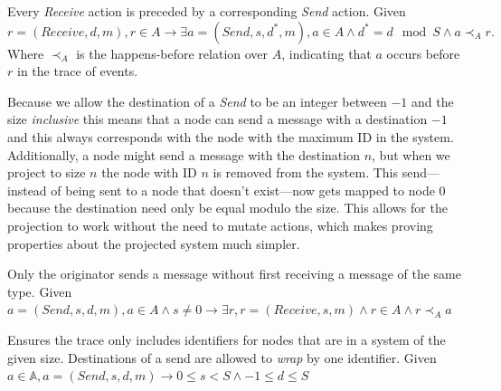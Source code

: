 \documentclass[runningheads]{llncs}
\newcommand{\action}{\mathds{A}}
\newcommand{\happensbefore}{\prec_A}
\begin{document}
\begin{definition}
Every \emph{Receive} action is preceded by a corresponding \emph{Send} action. 
Given $r = (Receive, d, m), r \in A \longrightarrow \exists a = (Send, s, d^*, m), a \in A \wedge d^* = d \mod S \wedge a \happensbefore r.$ Where $\happensbefore$ is the happens-before relation over $A$, indicating that $a$ occurs before $r$ in the trace of events. 
\end{definition}

Because we allow the destination of a \emph{Send} to be an integer between $-1$ and the size \emph{inclusive} this means that a node can send a message with a destination $-1$ and this always corresponds with the node with the maximum ID in the system. Additionally, a node might send a message with the destination $n$, but when we project to size $n$ the node with ID $n$ is removed from the system. This send---instead of being sent to a node that doesn't exist---now gets mapped to node $0$ because the destination need only be equal modulo the size. This allows for the projection to work without the need to mutate actions, which makes proving properties about the projected system much simpler.  

\begin{definition} Only the originator sends a message without first receiving a message of the same type.
Given $a = (Send, s, d, m), a \in A \wedge s \neq 0 \longrightarrow \exists r, r = (Receive, s, m) \wedge r \in A \wedge r \happensbefore a$
\end{definition}

\begin{definition} Ensures the trace only includes identifiers for nodes that are in a system of the given size. Destinations of a send are allowed to \emph{wrap} by one identifier. Given $a \in \action, a = (Send, s, d, m) \longrightarrow 0 \le s < S \wedge -1 \le d \le S$
\end{definition}
\end{document}
